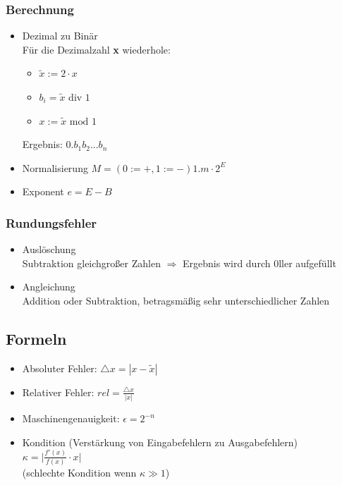 \subsubsection*{Berechnung}
\begin{itemize}

	\item Dezimal zu Binär \\
	Für die Dezimalzahl \textbf{x} wiederhole:
	\begin{itemize}
		\item $\widetilde{x} := 2 \cdot x$
		\item $b_i = \widetilde{x}\text{ div }1$
		\item $x := \widetilde{x}\text{ mod }1$
	\end{itemize}
	Ergebnis: $0.b_1b_2...b_n$
	
	\item Normalisierung $M = (0:=+, 1:=-) 1.m \cdot 2^E$ \\
	
	\item Exponent $e = E - B$ \\

\end{itemize}

\subsubsection*{Rundungsfehler}
\begin{itemize}

	\item Auslöschung \\
	Subtraktion gleichgroßer Zahlen $\Rightarrow$ Ergebnis wird durch 0ller aufgefüllt
	
	\item Angleichung \\
	Addition oder Subtraktion, betragsmäßig sehr unterschiedlicher Zahlen

\end{itemize}

\subsection{Formeln}
\begin{itemize}

	\item Absoluter Fehler: $\bigtriangleup x = |x - \widetilde{x}|$
	
	\item Relativer Fehler: $rel = \frac{\bigtriangleup x}{|x|}$
	
	\item Maschinengenauigkeit: $\epsilon = 2^{-n}$
	
	\item Kondition (Verstärkung von Eingabefehlern zu Ausgabefehlern) \\
	$\kappa = \bigg|\frac{f'(x)}{f(x)} \cdot x\bigg|$\\
	(schlechte Kondition wenn $\kappa \gg 1$)

\end{itemize}
